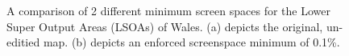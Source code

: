 \begin{figure}
\caption{A comparison of 2 different minimum screen spaces for the Lower Super Output Areas (LSOAs) of Wales. (a) depicts the original, un-editied map. (b) depicts an enforced screenspace minimum of 0.1\%.} \label{fig:compareA}
\end{figure}

